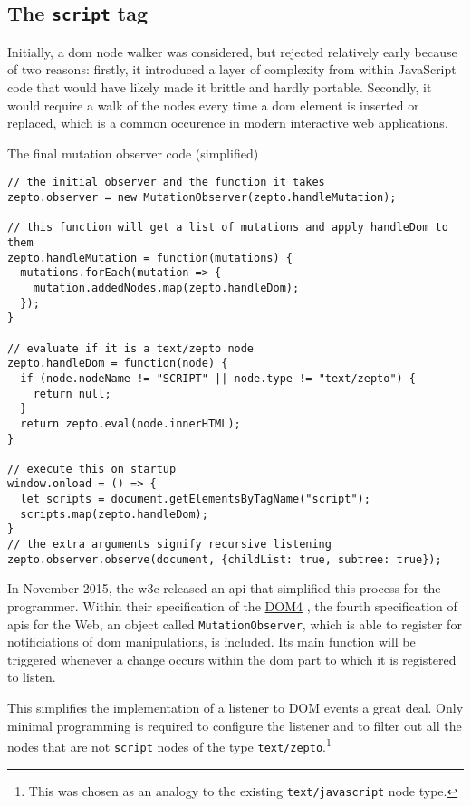 \documentclass[oneside,11pt,xetex]{scrbook}
\begin{document}
\subsection{The \texttt{script} tag}
\label{sec:MutObs}

Initially, a \gls{dom} node walker was considered, but rejected relatively early because of two reasons:
firstly, it introduced a layer of complexity from within JavaScript code that would have likely made
it brittle and hardly portable. Secondly, it would require a walk of the nodes every time a \gls{dom}
element is inserted or replaced, which is a common occurence in modern interactive web applications.

\begin{listing}[H]
\caption{The final mutation observer code (simplified)}
\begin{verbatim}
// the initial observer and the function it takes
zepto.observer = new MutationObserver(zepto.handleMutation);

// this function will get a list of mutations and apply handleDom to them
zepto.handleMutation = function(mutations) {
  mutations.forEach(mutation => {
    mutation.addedNodes.map(zepto.handleDom);
  });
}

// evaluate if it is a text/zepto node
zepto.handleDom = function(node) {
  if (node.nodeName != "SCRIPT" || node.type != "text/zepto") {
    return null;
  }
  return zepto.eval(node.innerHTML);
}

// execute this on startup
window.onload = () => {
  let scripts = document.getElementsByTagName("script");
  scripts.map(zepto.handleDom);
}
// the extra arguments signify recursive listening
zepto.observer.observe(document, {childList: true, subtree: true});
\end{verbatim}
\label{fig:mutobs}
\end{listing}

In November 2015, the \gls{w3c} released an \gls{api} that simplified this process
for the programmer. Within their specification of the
\href{https://www.w3.org/TR/dom/#mutationobserver}{DOM4} \parencite{DOM4} , the fourth
specification of \gls{api}s for the Web, an object called \texttt{MutationObserver}, which is
able to register for notificiations of \gls{dom} manipulations, is included. Its main function
will be triggered whenever a change occurs within the \gls{dom} part to which it is registered
to listen.

This simplifies the implementation of a listener to DOM events a great deal. Only minimal programming
is required to configure the listener and to filter out all the nodes that are not \texttt{script}
nodes of the type \texttt{text/zepto}.\footnote{This was chosen as an analogy to the existing
\texttt{text/javascript} node type.}
\end{document}
